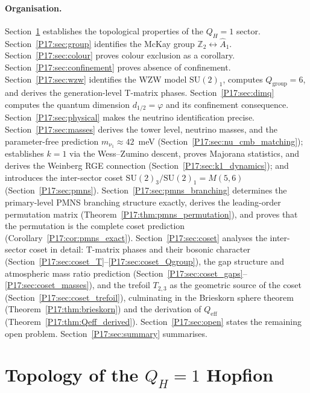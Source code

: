 \documentclass[11pt,a4paper]{article}
\theoremstyle{definition}\newtheorem{definition}[theorem]{Definition}
\theoremstyle{remark}
\newcommand{\vp}{\varphi}
\newcommand{\SU}{\mathrm{SU}}
\newcommand{\QH}{Q_H}
\newcommand{\Ztwo}{\mathbb{Z}_2}
\newcommand{\dimq}[1]{d_{#1}}
\begin{document}
\paragraph{Organisation.}
Section~\ref{P17:sec:topology} establishes the topological properties of
the $\QH=1$ sector. Section~\ref{P17:sec:group} identifies the McKay group
$\Ztwo\leftrightarrow\widehat{A}_1$. Section~\ref{P17:sec:colour} proves
colour exclusion as a corollary. Section~\ref{P17:sec:confinement} proves
absence of confinement. Section~\ref{P17:sec:wzw} identifies the WZW model
$\SU(2)_1$, computes $Q_{\mathrm{group}}=6$, and derives the
generation-level T-matrix phases. Section~\ref{P17:sec:dimq} computes the
quantum dimension $\dimq{1/2}=\vp$ and its confinement consequence.
Section~\ref{P17:sec:physical} makes the neutrino identification precise.
Section~\ref{P17:sec:masses} derives the tower level, neutrino masses,
and the parameter-free prediction $m_{\nu_1}\approx42$~meV
(Section~\ref{P17:sec:nu_cmb_matching}); establishes $k=1$ via the
Wess--Zumino descent, proves Majorana statistics, and derives
the Weinberg RGE connection (Section~\ref{P17:sec:k1_dynamics}); and
introduces the inter-sector coset $\SU(2)_3/\SU(2)_1=M(5,6)$
(Section~\ref{P17:sec:pmns}).
Section~\ref{P17:sec:pmns_branching} determines the primary-level PMNS
branching structure exactly, derives the leading-order permutation
matrix (Theorem~\ref{P17:thm:pmns_permutation}), and proves that the
permutation is the complete coset prediction
(Corollary~\ref{P17:cor:pmns_exact}).
Section~\ref{P17:sec:coset} analyses the inter-sector coset in detail:
T-matrix phases and their bosonic character
(Section~\ref{P17:sec:coset_T}--\ref{P17:sec:coset_Qgroup}), the gap
structure and atmospheric mass ratio prediction
(Section~\ref{P17:sec:coset_gaps}--\ref{P17:sec:coset_masses}), and the
trefoil $T_{2,3}$ as the geometric source of the coset
(Section~\ref{P17:sec:coset_trefoil}), culminating in the Brieskorn
sphere theorem (Theorem~\ref{P17:thm:brieskorn}) and the derivation
of $Q_{\mathrm{eff}}$ (Theorem~\ref{P17:thm:Qeff_derived}).
Section~\ref{P17:sec:open} states the remaining open problem.
Section~\ref{P17:sec:summary} summarises.

\section{Topology of the $\QH=1$ Hopfion}
\label{P17:sec:topology}
\end{document}
